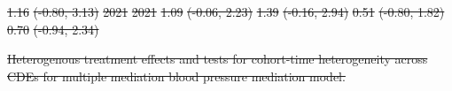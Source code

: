 \documentclass[
  letterpaper,
  DIV=11,
  numbers=noendperiod]{scrartcl}
\makeatletter
\renewenvironment{table}%
   {\renewcommand\familydefault\sfdefault
    \@float{table}}
   {\end@float}
\providecommand{\DIFdel}[1]{{\protect\color{red}\sout{#1}}}                      %
\providecommand{\DIFdelFL}[1]{\DIFdel{#1}} %
\makeatother
\begin{document}
\DIFdelFL{1.16 }%
\DIFdelFL{(-0.80, 3.13)}%
\DIFdelFL{\hspace{1em}2021 }%
\DIFdelFL{2021 }%
\DIFdelFL{1.09 }%
\DIFdelFL{(-0.06, 2.23) }%
\DIFdelFL{1.39 }%
\DIFdelFL{(-0.16, 2.94) }%
\DIFdelFL{0.51 }%
\DIFdelFL{(-0.80, 1.82) }%
\DIFdelFL{0.70 }%
\DIFdelFL{(-0.94, 2.34)}%

{%
\DIFdelFL{Heterogenous treatment effects and tests for cohort-time heterogeneity
across CDEs for multiple mediation blood pressure mediation model. }}%
\end{document}
